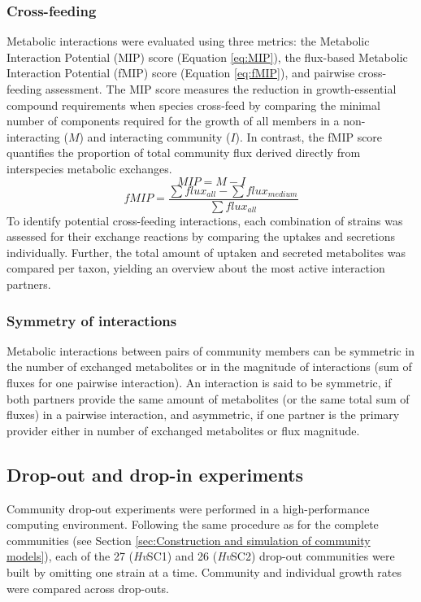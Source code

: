 \subsubsection{Cross-feeding}
Metabolic interactions were evaluated using three metrics: the Metabolic Interaction Potential (MIP) score (Equation \ref{eq:MIP}), the flux-based Metabolic Interaction Potential (fMIP) score (Equation \ref{eq:fMIP}), and pairwise cross-feeding assessment. The MIP score measures the reduction in growth-essential compound requirements when species cross-feed by comparing the minimal number of components required for the growth of all members in a non-interacting ($M$) and interacting community ($I$). In contrast, the fMIP score quantifies the proportion of total community flux derived directly from interspecies metabolic exchanges.
\begin{equation}
	MIP = M - I
	\label{eq:MIP}
\end{equation}
\begin{equation}
  fMIP = \frac{\sum flux_{all} - \sum flux_{medium}}{\sum flux_{all}}
  \label{eq:fMIP}
\end{equation}
To identify potential cross-feeding interactions, each combination of strains was assessed for their exchange reactions by comparing the uptakes and secretions individually. Further, the total amount of uptaken and secreted metabolites was compared per taxon, yielding an overview about the most active interaction partners.

\subsubsection{Symmetry of interactions}
Metabolic interactions between pairs of community members can be symmetric in the number of exchanged metabolites or in the magnitude of interactions (sum of fluxes for one pairwise interaction). An interaction is said to be symmetric, if both partners provide the same amount of metabolites (or the same total sum of fluxes) in a pairwise interaction, and asymmetric, if one partner is the primary provider either in number of exchanged metabolites or flux magnitude.

\subsection{Drop-out and drop-in experiments}
Community drop-out experiments were performed in a high-performance computing environment. Following the same procedure as for the complete communities (see Section \ref{sec:Construction and simulation of community models}), each of the 27 (\textit{Hv}SC1) and 26 (\textit{Hv}SC2) drop-out communities were built by omitting one strain at a time. Community and individual growth rates were compared across drop-outs.
